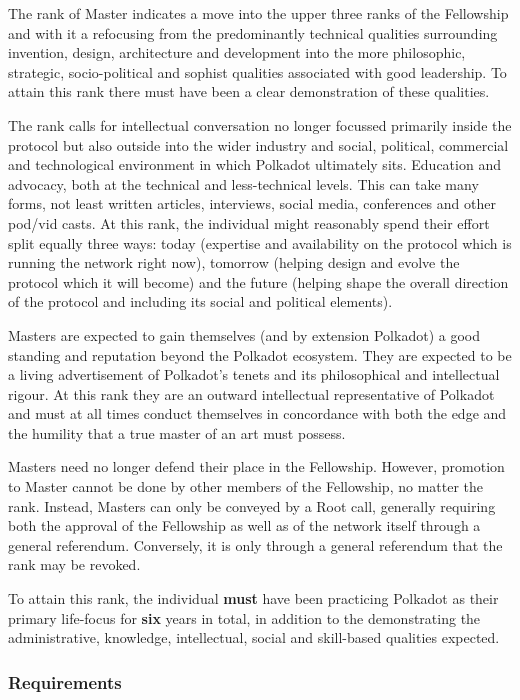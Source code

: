 \documentclass[9pt,oneside]{amsart}
\begin{document}
The rank of Master indicates a move into the upper three ranks of the Fellowship and with it a refocusing from the predominantly technical qualities surrounding invention, design, architecture and development into the more philosophic, strategic, socio-political and sophist qualities associated with good leadership. To attain this rank there must have been a clear demonstration of these qualities.

The rank calls for intellectual conversation no longer focussed primarily inside the protocol but also outside into the wider industry and social, political, commercial and technological environment in which Polkadot ultimately sits. Education and advocacy, both at the technical and less-technical levels. This can take many forms, not least written articles, interviews, social media, conferences and other pod/vid casts. At this rank, the individual might reasonably spend their effort split equally three ways: today (expertise and availability on the protocol which is running the network right now), tomorrow (helping design and evolve the protocol which it will become) and the future (helping shape the overall direction of the protocol and including its social and political elements).

Masters are expected to gain themselves (and by extension Polkadot) a good standing and reputation beyond the Polkadot ecosystem. They are expected to be a living advertisement of Polkadot's tenets and its philosophical and intellectual rigour. At this rank they are an outward intellectual representative of Polkadot and must at all times conduct themselves in concordance with both the edge and the humility that a true master of an art must possess.

Masters need no longer defend their place in the Fellowship. However, promotion to Master cannot be done by other members of the Fellowship, no matter the rank. Instead, Masters can only be conveyed by a Root call, generally requiring both the approval of the Fellowship as well as of the network itself through a general referendum. Conversely, it is only through a general referendum that the rank may be revoked.

To attain this rank, the individual \textbf{must} have been practicing Polkadot as their primary life-focus for \textbf{six} years in total, in addition to the demonstrating the administrative, knowledge, intellectual, social and skill-based qualities expected.

\subsubsection{Requirements}\label{requirements-6}
\end{document}
